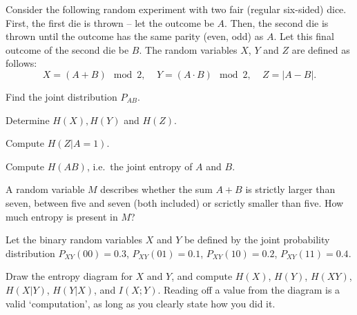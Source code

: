 \documentclass[a4paper,10pt,landscape,twocolumn]{scrartcl}
\begin{document}
\homeworkproblems

\begin{exercise}
Consider the following random experiment with two fair (regular six-sided) dice. First, the first die is thrown -- let the outcome be $A$. Then, the second die is thrown until the outcome has the same parity (even, odd) as $A$. Let this final outcome of the second die be $B$. The random variables $X$, $Y$ and $Z$ are defined as follows:
\[
X = (A + B) \mod 2, \ \ \ \ \ Y = (A \cdot B) \mod 2, \ \ \ \ \ Z = |A - B|.
\]
	\begin{subex}[(1pt)]
	Find the joint distribution $P_{AB}$.
	\end{subex}
	\begin{subex}[(1pt)]
	Determine $H(X), H(Y)$ and $H(Z)$.
	\end{subex}
	\begin{subex}[(1pt)]
	Compute $H(Z|A=1)$.
	\end{subex}
	\begin{subex}[(1pt)]
	Compute $H(AB)$, i.e.\ the joint entropy of $A$ and $B$.
	\end{subex}
	\begin{subex}[(2pt)]
	A random variable $M$ describes whether the sum $A + B$ is strictly larger than seven, between five and seven (both included) or scrictly smaller than five. How much entropy is present in $M$?
	\end{subex}
\end{exercise}

\begin{exercise}
Let the binary random variables $X$ and $Y$ be defined by the joint probability distribution $P_{XY}(00) = 0.3$, $P_{XY}(01) = 0.1$, $P_{XY}(10) = 0.2$, $P_{XY}(11) = 0.4$.

Draw the entropy diagram for $X$ and $Y$, and compute $H(X)$, $H(Y)$, $H(XY)$, $H(X|Y)$, $H(Y|X)$, and $I(X;Y)$. Reading off a value from the diagram is a valid `computation', as long as you clearly state how you did it.
\begin{center}
\end{center}
\end{exercise}
\end{document}
